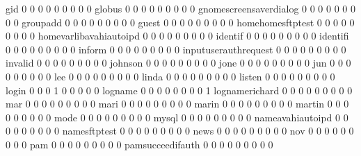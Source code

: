 \documentclass[compress,8pt]{beamer}
\begin{document}
\begin{frame}
\begin{Schunk}
  gid                                        0   0   0   0   0   0   0   0   0
  globus                                     0   0   0   0   0   0   0   0   0
  gnomescreensaverdialog                     0   0   0   0   0   0   0   0   0
  groupadd                                   0   0   0   0   0   0   0   0   0
  guest                                      0   0   0   0   0   0   0   0   0
  homehomesftptest                           0   0   0   0   0   0   0   0   0
  homevarlibavahiautoipd                     0   0   0   0   0   0   0   0   0
  identif                                    0   0   0   0   0   0   0   0   0
  identifi                                   0   0   0   0   0   0   0   0   0
  inform                                     0   0   0   0   0   0   0   0   0
  inputuserauthrequest                       0   0   0   0   0   0   0   0   0
  invalid                                    0   0   0   0   0   0   0   0   0
  johnson                                    0   0   0   0   0   0   0   0   0
  jone                                       0   0   0   0   0   0   0   0   0
  jun                                        0   0   0   0   0   0   0   0   0
  lee                                        0   0   0   0   0   0   0   0   0
  linda                                      0   0   0   0   0   0   0   0   0
  listen                                     0   0   0   0   0   0   0   0   0
  login                                      0   0   0   1   0   0   0   0   0
  logname                                    0   0   0   0   0   0   0   0   1
  lognamerichard                             0   0   0   0   0   0   0   0   0
  mar                                        0   0   0   0   0   0   0   0   0
  mari                                       0   0   0   0   0   0   0   0   0
  marin                                      0   0   0   0   0   0   0   0   0
  martin                                     0   0   0   0   0   0   0   0   0
  mode                                       0   0   0   0   0   0   0   0   0
  mysql                                      0   0   0   0   0   0   0   0   0
  nameavahiautoipd                           0   0   0   0   0   0   0   0   0
  namesftptest                               0   0   0   0   0   0   0   0   0
  news                                       0   0   0   0   0   0   0   0   0
  nov                                        0   0   0   0   0   0   0   0   0
  pam                                        0   0   0   0   0   0   0   0   0
  pamsucceedifauth                           0   0   0   0   0   0   0   0   0

\end{Schunk}
\end{frame}
\end{document}
